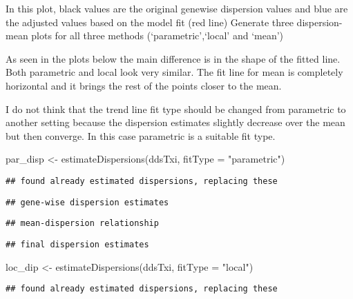 \documentclass[
]{article}
\newenvironment{Shaded}{\begin{snugshade}}{\end{snugshade}}
\newcommand{\AttributeTok}[1]{\textcolor[rgb]{0.77,0.63,0.00}{#1}}
\newcommand{\FunctionTok}[1]{\textcolor[rgb]{0.00,0.00,0.00}{#1}}
\newcommand{\NormalTok}[1]{#1}
\newcommand{\OtherTok}[1]{\textcolor[rgb]{0.56,0.35,0.01}{#1}}
\newcommand{\StringTok}[1]{\textcolor[rgb]{0.31,0.60,0.02}{#1}}
\begin{document}
In this plot, black values are the original genewise dispersion values
and blue are the adjusted values based on the model fit (red line)
Generate three dispersion-mean plots for all three methods
(`parametric',`local' and `mean')

As seen in the plots below the main difference is in the shape of the
fitted line. Both parametric and local look very similar. The fit line
for mean is completely horizontal and it brings the rest of the points
closer to the mean.

I do not think that the trend line fit type should be changed from
parametric to another setting because the dispersion estimates slightly
decrease over the mean but then converge. In this case parametric is a
suitable fit type.

\begin{Shaded}
\begin{Highlighting}[]
\NormalTok{par\_disp }\OtherTok{\textless{}{-}} \FunctionTok{estimateDispersions}\NormalTok{(ddsTxi, }\AttributeTok{fitType =} \StringTok{"parametric"}\NormalTok{)}
\end{Highlighting}
\end{Shaded}

\begin{verbatim}
## found already estimated dispersions, replacing these
\end{verbatim}

\begin{verbatim}
## gene-wise dispersion estimates
\end{verbatim}

\begin{verbatim}
## mean-dispersion relationship
\end{verbatim}

\begin{verbatim}
## final dispersion estimates
\end{verbatim}

\begin{Shaded}
\begin{Highlighting}[]
\NormalTok{loc\_dip }\OtherTok{\textless{}{-}} \FunctionTok{estimateDispersions}\NormalTok{(ddsTxi, }\AttributeTok{fitType =} \StringTok{"local"}\NormalTok{)}
\end{Highlighting}
\end{Shaded}

\begin{verbatim}
## found already estimated dispersions, replacing these
\end{verbatim}
\end{document}
